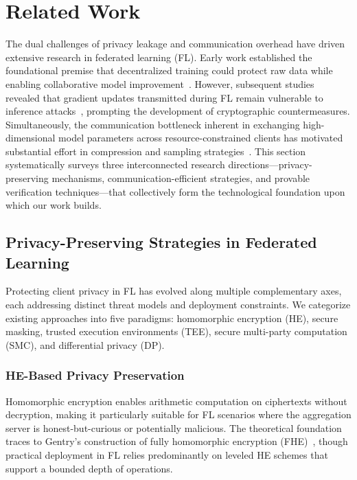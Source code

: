 \section{Related Work}
\label{sec:related-work}

The dual challenges of privacy leakage and communication overhead have driven extensive research in federated learning (FL). Early work established the foundational premise that decentralized training could protect raw data while enabling collaborative model improvement~\cite{mcmahan2017communication}. However, subsequent studies revealed that gradient updates transmitted during FL remain vulnerable to inference attacks~\cite{melis2019exploiting,nasr2019comprehensive}, prompting the development of cryptographic countermeasures. Simultaneously, the communication bottleneck inherent in exchanging high-dimensional model parameters across resource-constrained clients has motivated substantial effort in compression and sampling strategies~\cite{sattler2020robust,konecny2016federated}. This section systematically surveys three interconnected research directions---privacy-preserving mechanisms, communication-efficient strategies, and provable verification techniques---that collectively form the technological foundation upon which our work builds.

\subsection{Privacy-Preserving Strategies in Federated Learning}
\label{subsec:privacy-preserving}

Protecting client privacy in FL has evolved along multiple complementary axes, each addressing distinct threat models and deployment constraints. We categorize existing approaches into five paradigms: homomorphic encryption (HE), secure masking, trusted execution environments (TEE), secure multi-party computation (SMC), and differential privacy (DP).

\subsubsection{HE-Based Privacy Preservation}
\label{subsubsec:he-based}

Homomorphic encryption enables arithmetic computation on ciphertexts without decryption, making it particularly suitable for FL scenarios where the aggregation server is honest-but-curious or potentially malicious. The theoretical foundation traces to Gentry's construction of fully homomorphic encryption (FHE)~\cite{gentry2009fully}, though practical deployment in FL relies predominantly on leveled HE schemes that support a bounded depth of operations.

